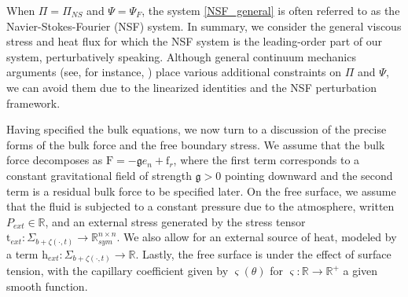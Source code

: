 \documentclass[11pt,letterpaper,reqno]{amsart}
\numberwithin{equation}{section}
\begin{document}
When $\Pi = \Pi_{NS}$ and $\Psi = \Psi_F$, the system \eqref{NSF_general} is often referred to as the Navier-Stokes-Fourier (NSF) system. In summary, we consider the general viscous stress and heat flux for which the NSF system is the leading-order part of our system, perturbatively speaking. Although general continuum mechanics arguments (see, for instance, \cite{Gurtin_Fried_Anand_2010}) place various additional constraints on $\Pi$ and $\Psi$, we can avoid them due to the linearized identities and the NSF perturbation framework.


Having specified the bulk equations, we now turn to a discussion of the precise forms of the bulk force and the free boundary stress. We assume that the bulk force decomposes as $\mathrm{F} = -\mathfrak{g} e_n + \mathrm{f}_{r}$, where the first term corresponds to a constant gravitational field of strength \(\mathfrak{g}>0\) pointing downward and the second term is a residual bulk force to be specified later.  On the free surface, we assume that the fluid is subjected to a constant pressure due to the atmosphere, written \(P_{ext} \in \mathbb{R}\), and an external stress generated by the stress tensor $\mathrm{t}_{ext} : \Sigma_{b + \zeta(\cdot,t)} \to \mathbb{R}^{n \times n}_{sym}$.  We also  allow for an external source of heat, modeled by a term $\mathrm{h}_{ext} : \Sigma_{b + \zeta(\cdot,t)} \to \mathbb{R}$.  Lastly, the free surface is under the effect of surface tension, with the capillary coefficient given by $\varsigma(\theta)$ for $\varsigma : \mathbb{R} \to \mathbb{R}^+$ a given smooth function.
\end{document}
